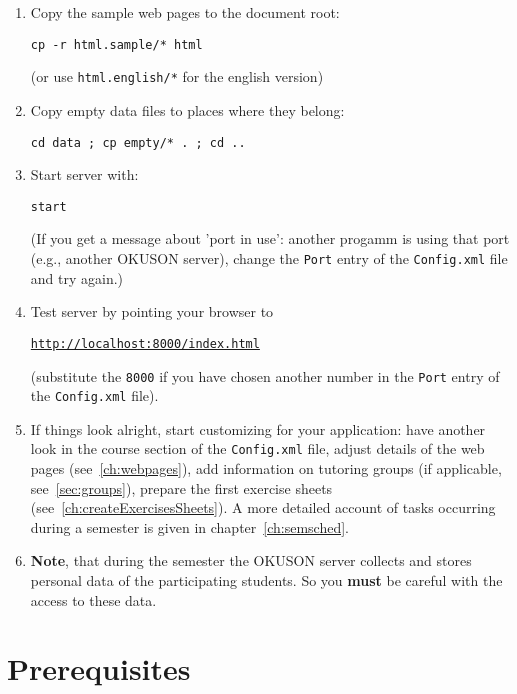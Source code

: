 \documentclass[12pt,openany,a4paper]{book}
\newcommand{\OKUSON}{\textsf{OKUSON}}
\begin{document}
\begin{enumerate}
\item Copy the sample web pages to the document root: 

\hspace*{5mm}\verb!cp -r html.sample/* html!

(or use \verb!html.english/*! for the english version)
\item Copy empty data files to places where they belong:

\hspace*{5mm}\texttt{cd data ; cp empty/* . ; cd ..}
\item Start server with: 

\hspace*{5mm}\texttt{start}

(If you get a message about 'port in use': another progamm is using that
port (e.g., another {\OKUSON} server), change the \texttt{Port} 
entry of the \texttt{Config.xml} file and try again.)
\item Test server by pointing your browser to 

\hspace*{5mm}\href{http://localhost:8000/index.html}%
{\texttt{http://localhost:8000/index.html}}

(substitute the \texttt{8000} if you have chosen another number in the
\texttt{Port} entry of the \texttt{Config.xml} file).
\item If things look alright, start customizing for your application:
have another look in the course section of the \texttt{Config.xml} file,
adjust details of the web pages (see~\ref{ch:webpages}), add information 
on tutoring groups (if applicable, see~\ref{sec:groups}), prepare the first
exercise sheets (see~\ref{ch:createExercisesSheets}). A more detailed
account of tasks occurring during a semester is given in 
chapter~\ref{ch:semsched}.
\item \textbf{Note}, that during the semester the {\OKUSON} server collects
and stores personal data of the participating students. So you \textbf{must}
be careful with the access to these data.
\end{enumerate}


\section{Prerequisites}
\end{document}

